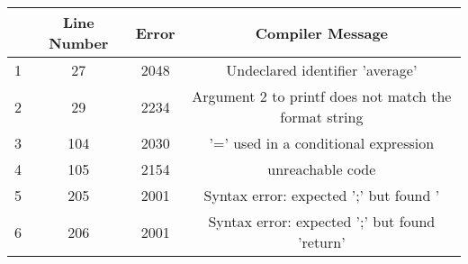 \documentclass{article}
\begin{document}
\begin{center}
\begin{table}[h!]
\centering
 \begin{tabular}{||c c c c||} 
 \hline
  & Line Number & Error & Compiler Message \\ [0.5ex] 
 \hline\hline
 1 & 27 & 2048  & Undeclared identifier 'average'  \\ 
 2 & 29 & 2234  & Argument 2 to printf does not match the format string  \\
 3 & 104 & 2030 & '=' used in a conditional expression  \\
 4 & 105 & 2154 & unreachable code  \\
 5 & 205 & 2001 & Syntax error: expected ';' but found '{' \\ 
 6 & 206 & 2001 & Syntax error: expected ';' but found 'return' \\ [1ex] 
 \hline
 \end{tabular}
\end{table}
\end{center}
	
\end{document}
